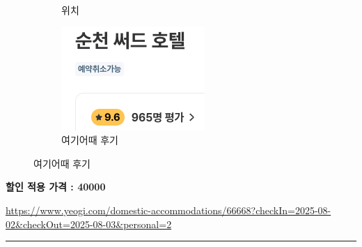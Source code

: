 \documentclass[10pt]{article}
\begin{document}
\begin{figure}[htbp]
\begin{subfigure}{0.3\textwidth}
    \caption{위치}
    \label{fig:2}
  \end{subfigure}
  \hfill
  \begin{subfigure}{0.3\textwidth}
    \centering
    \includegraphics[width=\linewidth]{fig/6_후기.png}
    \caption{여기어때 후기}
    \label{fig:3}
  \end{subfigure}
  \label{fig:three}
\end{figure}
\begin{center}
\textbf{할인 적용 가격 : 40000}
\end{center}
\url{https://www.yeogi.com/domestic-accommodations/66668?checkIn=2025-08-02&checkOut=2025-08-03&personal=2}

\bigskip      %
\hrule        %
\bigskip
\end{document}
